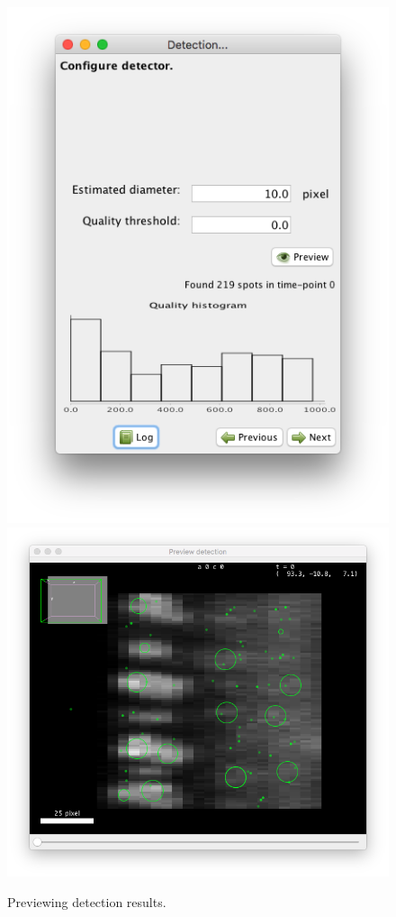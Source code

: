 \begin{figure}
    \label{fig:PreviewDetection}
    \centering
         \includegraphics[height=0.25\textheight]{figures/Mastodon_DoGconfig1.png}
         \includegraphics[height=0.25\textheight]{figures/Mastodon_DoGconfig2.png}
    \caption{Previewing detection results.}
\end{figure}

